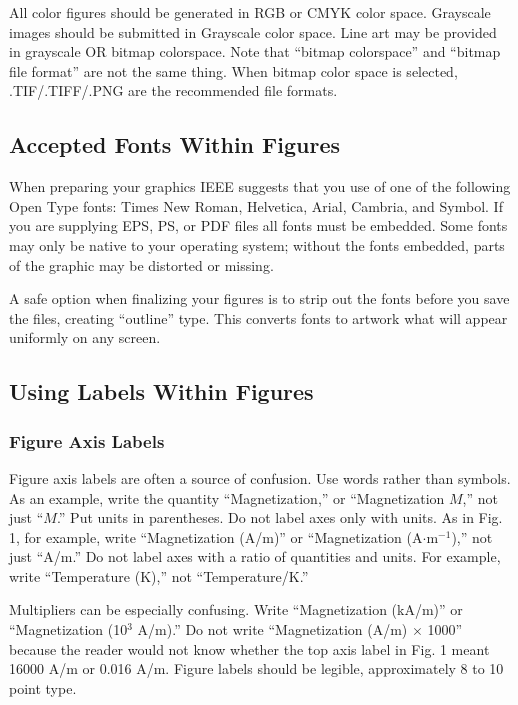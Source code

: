 \documentclass[journal]{IEEEtai}
\begin{document}
All color figures should be generated in RGB or CMYK color space. Grayscale images should be submitted in Grayscale color space. Line art may be provided in grayscale OR bitmap colorspace. Note that ``bitmap colorspace'' and ``bitmap file format'' are not the same thing. When bitmap color space is selected, .TIF/.TIFF/.PNG are the recommended file formats.

\subsection{Accepted Fonts Within Figures}

When preparing your graphics IEEE suggests that you use of one of the following Open Type fonts: Times New Roman, Helvetica, Arial, Cambria, and Symbol. If you are supplying EPS, PS, or PDF files all fonts must be embedded. Some fonts may only be native to your operating system; without the fonts embedded, parts of the graphic may be distorted or missing.

A safe option when finalizing your figures is to strip out the fonts before you save the files, creating ``outline'' type. This converts fonts to artwork what will appear uniformly on any screen.

\subsection{Using Labels Within Figures}

\subsubsection{Figure Axis Labels}

Figure axis labels are often a source of confusion. Use words rather than symbols. As an example, write the quantity ``Magnetization,'' or ``Magnetization $M$,'' not just ``$M$.'' Put units in parentheses. Do not label axes only with units. As in Fig. 1, for example, write ``Magnetization (A/m)'' or ``Magnetization (A$\cdot$m$^{-1}$),'' not just ``A/m.'' Do not label axes with a ratio of quantities and units. For example, write ``Temperature (K),'' not ``Temperature/K.''
 
Multipliers can be especially confusing. Write ``Magnetization (kA/m)'' or ``Magnetization (10$^3$ A/m).'' Do not write ``Magnetization (A/m) $\times$ 1000'' because the reader would not know whether the top axis label in Fig. 1 meant 16000 A/m or 0.016 A/m. Figure labels should be legible, approximately 8 to 10 point type.
\end{document}
